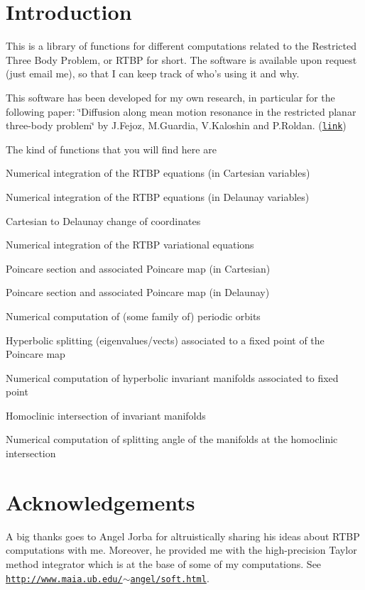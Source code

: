\hypertarget{index_Introduction}{}\section{Introduction}\label{index_Introduction}
This is a library of functions for different computations related to the Restricted Three Body Problem, or RTBP for short. The software is available upon request (just email me), so that I can keep track of who's using it and why.

This software has been developed for my own research, in particular for the following paper: \char`\"{}Diffusion along mean motion resonance in the restricted planar three-\/body
  problem\char`\"{} by J.Fejoz, M.Guardia, V.Kaloshin and P.Roldan. (\href{http://arxiv.org/abs/1109.2892}{\tt link})

The kind of functions that you will find here are
\begin{DoxyItemize}
\item Numerical integration of the RTBP equations (in Cartesian variables)
\item Numerical integration of the RTBP equations (in Delaunay variables)
\item Cartesian to Delaunay change of coordinates
\item Numerical integration of the RTBP variational equations
\item Poincare section and associated Poincare map (in Cartesian)
\item Poincare section and associated Poincare map (in Delaunay)
\item Numerical computation of (some family of) periodic orbits
\item Hyperbolic splitting (eigenvalues/vects) associated to a fixed point of the Poincare map
\item Numerical computation of hyperbolic invariant manifolds associated to fixed point
\item Homoclinic intersection of invariant manifolds
\item Numerical computation of splitting angle of the manifolds at the homoclinic intersection
\end{DoxyItemize}\hypertarget{index_Acknowledgements}{}\section{Acknowledgements}\label{index_Acknowledgements}
A big thanks goes to Angel Jorba for altruistically sharing his ideas about RTBP computations with me. Moreover, he provided me with the high-\/precision Taylor method integrator which is at the base of some of my computations. See \href{http://www.maia.ub.edu/~angel/soft.html}{\tt http://www.maia.ub.edu/$\sim$angel/soft.html}. 